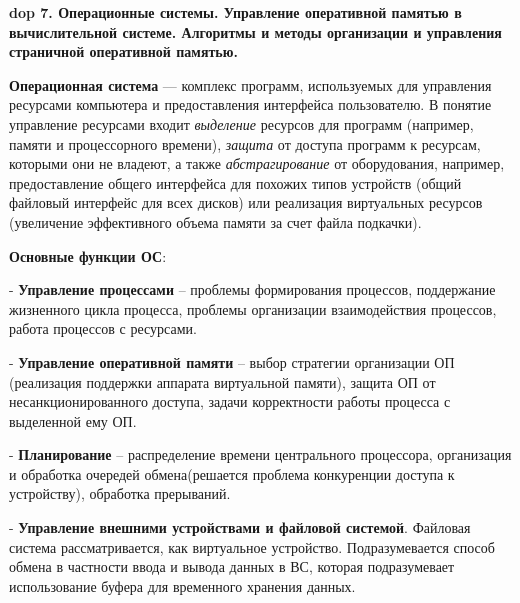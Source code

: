 \textbf{\LARGE dop 7. Операционные системы. Управление оперативной памятью в вычислительной системе. Алгоритмы и методы организации и управления страничной оперативной памятью.}

\textbf{Операционная система} --- комплекс программ, используемых для управления ресурсами компьютера и предоставления интерфейса пользователю.
В понятие управление ресурсами входит \textit{выделение} ресурсов для программ (например, памяти и процессорного времени),
\textit{защита} от доступа программ к ресурсам, которыми они не владеют, а также
\textit{абстрагирование} от оборудования, например, предоставление общего интерфейса для похожих типов устройств
(общий файловый интерфейс для всех дисков) или реализация виртуальных ресурсов (увеличение эффективного объема памяти за счет файла подкачки).



\textbf{Основные функции ОС}: 

- \textbf{Управление процессами} -- проблемы формирования процессов, поддержание жизненного цикла процесса, проблемы организации взаимодействия процессов, работа процессов с ресурсами.
    
- \textbf{Управление оперативной памяти} -- выбор стратегии организации ОП (реализация поддержки аппарата виртуальной памяти), защита ОП от несанкционированного доступа, задачи корректности работы процесса с выделенной ему ОП. 

- \textbf{Планирование} -- распределение времени центрального процессора, организация и обработка очередей обмена(решается проблема конкуренции доступа к устройству), обработка прерываний. 

- \textbf{Управление внешними устройствами и файловой системой}. Файловая система рассматривается, как виртуальное устройство. Подразумевается способ обмена в частности ввода и вывода данных в ВС, которая подразумевает использование буфера для временного хранения данных. 

